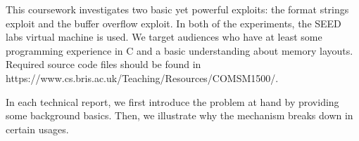 This coursework investigates two basic yet powerful exploits: the format strings exploit and the buffer overflow exploit. In both of the experiments, the SEED labs virtual machine is used. We target audiences who have at least some programming experience in C and a basic understanding about memory layouts. Required source code files should be found in \\
https://www.cs.bris.ac.uk/Teaching/Resources/COMSM1500/.

In each technical report, we first introduce the problem at hand by providing some background basics. Then, we illustrate why the mechanism breaks down in certain usages.